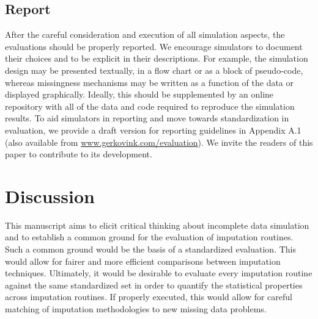 \documentclass[bimj,fleqn]{w-art}
\begin{document}



\subsection{Report}

After the careful consideration and execution of all simulation aspects, the evaluations should be properly reported. We encourage simulators to document their choices and to be explicit in their descriptions. For example, the simulation design may be presented textually, in a flow chart or as a block of pseudo-code, whereas missingness mechanisms may be written as a function of the data or displayed graphically. Ideally, this should be supplemented by an online repository with all of the data and code required to reproduce the simulation results. To aid simulators in reporting and move towards standardization in evaluation, we provide a draft version for reporting guidelines in Appendix A.1 (also available from \underline{www.gerkovink.com/evaluation}). We invite the readers of this paper to contribute to its development. 



\section{Discussion}

This manuscript aims to elicit critical thinking about incomplete data simulation and to establish a common ground for the evaluation of imputation routines. Such a common ground would be the basis of a standardized evaluation. This would allow for fairer and more efficient comparisons between imputation techniques. Ultimately, it would be desirable to evaluate every imputation routine against the same standardized set in order to quantify the statistical properties across imputation routines. If properly executed, this would allow for careful matching of imputation methodologies to new missing data problems. 
\end{document}
